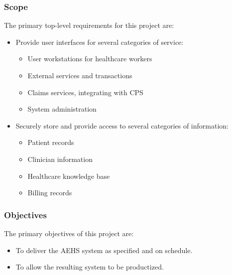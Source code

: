 \documentclass[11pt]{article}
\begin{document}
\subsubsection{Scope}
The primary top-level requirements for this project are:
\begin{itemize}
\item Provide user interfaces for several categories of service:
  \begin{itemize}
  \item User workstations for healthcare workers
  \item External services and transactions
  \item Claims services, integrating with CPS
  \item System administration
  \end{itemize}
\item Securely store and provide access to several categories of information:
  \begin{itemize}
  \item Patient records
  \item Clinician information
  \item Healthcare knowledge base
  \item Billing records
  \end{itemize}
\end{itemize}


\subsubsection{Objectives}
The primary objectives of this project are:
\begin{itemize}
\item To deliver the AEHS system as specified and on schedule.
\item To allow the resulting system to be productized.
\end{itemize}
\end{document}
